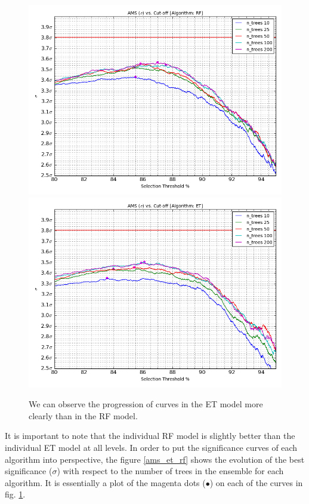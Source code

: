 \begin{figure}
\includegraphics[width=\textwidth]{images/AMS_Curve_RF_Cluster.png}
\includegraphics[width=\textwidth]{images/AMS_Curve_ET_Cluster.png}
\caption[AMS curves corresponding to increasing number of trees.]{We can observe the progression of curves in the ET model more clearly than in the RF model.}
\label{cluster}
\end{figure}

It is important to note that the individual RF model is slightly better than the individual ET model at all levels. In order to put the significance curves of each algorithm into perspective, the figure \ref{ams_et_rf} shows the evolution of the best significance ($\sigma$) with respect to the number of trees in the ensemble for each algorithm. It is essentially a plot of the magenta dots ({\color{magenta}\small{$\bullet$}}) on each  of the curves in fig. \ref{cluster}.

